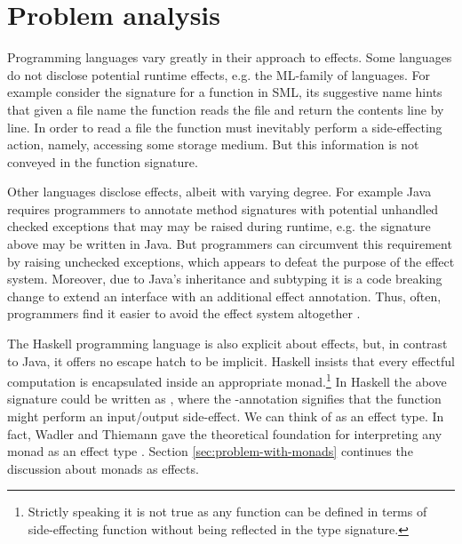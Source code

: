 \section{Problem analysis}\label{sec:problem-analysis}

Programming languages vary greatly in their approach to effects.
Some languages do not disclose potential runtime effects, e.g. the ML-family of languages. For example consider the signature  for a function in SML, its suggestive name hints that given a file name the function reads the file and return the contents line by line. In order to read a file the function must inevitably perform a side-effecting action, namely, accessing some storage medium. But this information is not conveyed in the function signature.

Other languages disclose effects, albeit with varying degree. For example Java requires programmers to annotate method signatures with potential unhandled checked exceptions that may may be raised during runtime, e.g. the signature above may be written  in Java. But programmers can circumvent this requirement by raising unchecked exceptions, which appears to defeat the purpose of the effect system. Moreover, due to Java's inheritance and subtyping it is a code breaking change to extend an interface with an additional effect annotation. Thus, often, programmers find it easier to avoid the effect system altogether \cite{Venners03}.

The Haskell programming language is also explicit about effects, but, in contrast to Java, it offers no escape hatch to be implicit. Haskell insists that every effectful computation is encapsulated inside an appropriate monad.\footnote{Strictly speaking it is not true as any function can be defined in terms of side-effecting  function without being reflected in the type signature.} In Haskell the above signature could be written as , where the -annotation signifies that the function might perform an input/output side-effect. We can think of  as an effect type. In fact, Wadler and Thiemann gave the theoretical foundation for interpreting any monad as an effect type \cite{Wadler2003}. Section \ref{sec:problem-with-monads} continues the discussion about monads as effects. %

